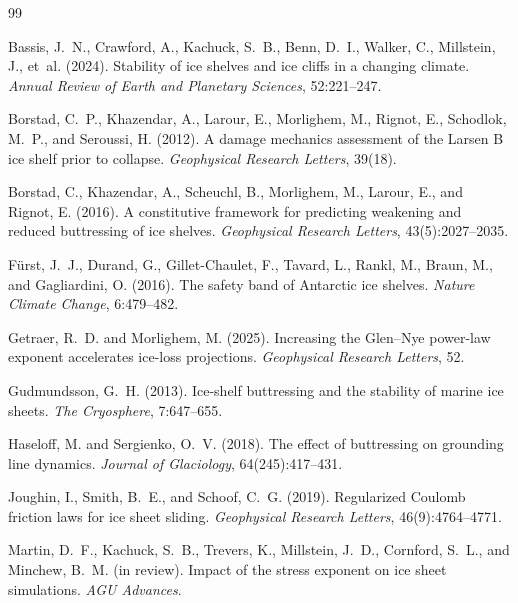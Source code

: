 \documentclass[11pt]{article}
\theoremstyle{definition}
\begin{document}

\begin{thebibliography}{99}

Bassis, J.~N., Crawford, A., Kachuck, S.~B., Benn, D.~I., Walker, C., Millstein, J., et~al. (2024).
\newblock Stability of ice shelves and ice cliffs in a changing climate.
\newblock \textit{Annual Review of Earth and Planetary Sciences}, 52:221--247.

Borstad, C.~P., Khazendar, A., Larour, E., Morlighem, M., Rignot, E., Schodlok, M.~P., and Seroussi, H. (2012).
\newblock A damage mechanics assessment of the {L}arsen {B} ice shelf prior to collapse.
\newblock \textit{Geophysical Research Letters}, 39(18).

Borstad, C., Khazendar, A., Scheuchl, B., Morlighem, M., Larour, E., and Rignot, E. (2016).
\newblock A constitutive framework for predicting weakening and reduced buttressing of ice shelves.
\newblock \textit{Geophysical Research Letters}, 43(5):2027--2035.

F{\"u}rst, J.~J., Durand, G., Gillet-Chaulet, F., Tavard, L., Rankl, M., Braun, M., and Gagliardini, O. (2016).
\newblock The safety band of {A}ntarctic ice shelves.
\newblock \textit{Nature Climate Change}, 6:479--482.

Getraer, R.~D. and Morlighem, M. (2025).
\newblock Increasing the {G}len--{N}ye power-law exponent accelerates ice-loss projections.
\newblock \textit{Geophysical Research Letters}, 52.

Gudmundsson, G.~H. (2013).
\newblock Ice-shelf buttressing and the stability of marine ice sheets.
\newblock \textit{The Cryosphere}, 7:647--655.

Haseloff, M. and Sergienko, O.~V. (2018).
\newblock The effect of buttressing on grounding line dynamics.
\newblock \textit{Journal of Glaciology}, 64(245):417--431.

Joughin, I., Smith, B.~E., and Schoof, C.~G. (2019).
\newblock Regularized {C}oulomb friction laws for ice sheet sliding.
\newblock \textit{Geophysical Research Letters}, 46(9):4764--4771.

Martin, D.~F., Kachuck, S.~B., Trevers, K., Millstein, J.~D., Cornford, S.~L., and Minchew, B.~M. (in review).
\newblock Impact of the stress exponent on ice sheet simulations.
\newblock \textit{AGU Advances}.


\end{thebibliography}
\end{document}
